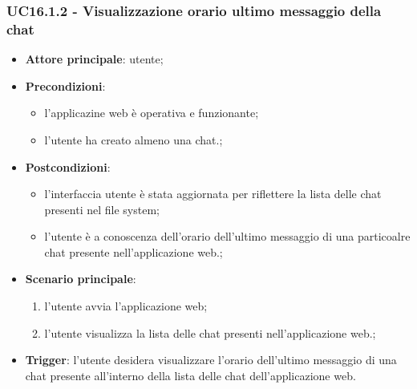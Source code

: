 \documentclass[10pt, a4paper]{article}
\begin{document}
    \subsubsection{UC16.1.2 - Visualizzazione orario ultimo messaggio della chat}
    \begin{itemize}
        \item \textbf{Attore principale}: utente;
        \item \textbf{Precondizioni}: 
        \begin{itemize}
            \item l'applicazine web è operativa e funzionante;
            \item l'utente ha creato almeno una chat.;
        \end{itemize}
        \item \textbf{Postcondizioni}: 
        \begin{itemize}
            \item l'interfaccia utente è stata aggiornata per riflettere la lista delle chat presenti nel file system;
            \item l'utente è a conoscenza dell'orario dell'ultimo messaggio di una particoalre chat presente nell'applicazione web.;
        \end{itemize}
        \item \textbf{Scenario principale}:
            \begin{enumerate}
                \item l'utente avvia l'applicazione web;
                \item l'utente visualizza la lista delle chat presenti nell'applicazione web.;
            \end{enumerate}
        \item \textbf{Trigger}: l'utente desidera visualizzare l'orario dell'ultimo messaggio di una chat presente all'interno della lista delle chat dell'applicazione web.
    \end{itemize}
\end{document}
